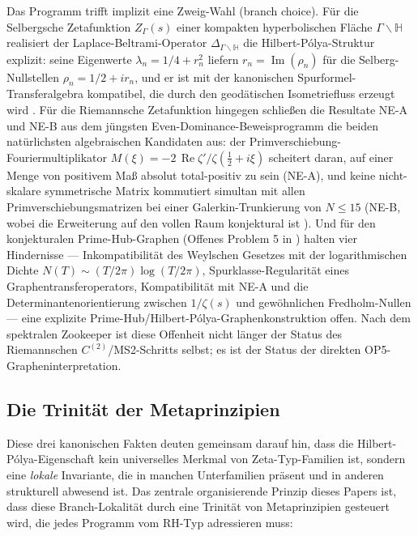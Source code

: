 \documentclass[11pt]{article}
\theoremstyle{definition}
\theoremstyle{remark}
\renewcommand{\Re}{\operatorname{Re}}
\newcommand{\halfline}{\tfrac{1}{2}}
\newcommand{\zer}[1]{\zeta'/\zeta(#1)}
\begin{document}
Das Programm trifft implizit eine Zweig-Wahl (branch choice). Für die Selbergsche Zetafunktion
$Z_\Gamma(s)$ einer kompakten hyperbolischen Fläche
$\Gamma\backslash\mathbb{H}$ realisiert der Laplace-Beltrami-Operator
$\Delta_{\Gamma\backslash\mathbb{H}}$ die Hilbert-P\'olya-Struktur
explizit: seine Eigenwerte $\lambda_n = 1/4 + r_n^2$ liefern
$r_n = \operatorname{Im}(\rho_n)$ für die Selberg-Nullstellen $\rho_n = 1/2 + ir_n$,
und er ist mit der kanonischen Spurformel-Transferalgebra kompatibel, die durch
den geodätischen Isometriefluss erzeugt wird \cite{Selberg1956}. Für die
Riemannsche Zetafunktion hingegen
schließen die Resultate NE-A und NE-B aus dem jüngsten Even-Dominance-Beweisprogramm
\cite{Geiger2026RHII} die beiden natürlichsten algebraischen Kandidaten aus:
der Primverschiebung-Fouriermultiplikator
$M(\xi) = -2\,\Re\zer{\halfline + i\xi}$ scheitert daran, auf einer Menge von positivem
Maß absolut total-positiv zu sein (NE-A), und keine nicht-skalare symmetrische Matrix
kommutiert simultan mit allen Primverschiebungsmatrizen bei einer
Galerkin-Trunkierung von $N\leq 15$ (NE-B, wobei die Erweiterung auf den vollen Raum konjektural
ist \cite{Geiger2026RHII}). Und für den konjekturalen Prime-Hub-Graphen (Offenes Problem 5 in
\cite{Geiger2026RHIII}) halten vier Hindernisse --- Inkompatibilität des Weylschen
Gesetzes mit der logarithmischen Dichte $N(T)\sim (T/2\pi)\log(T/2\pi)$, Spurklasse-Regularität
eines Graphentransferoperators, Kompatibilität mit NE-A und die
Determinantenorientierung zwischen $1/\zeta(s)$ und gewöhnlichen
Fredholm-Nullen --- eine explizite
Prime-Hub/Hilbert-P\'olya-Graphenkonstruktion offen. Nach dem spektralen Zookeeper \cite{Zookeeper2026}
ist diese Offenheit nicht länger der Status des Riemannschen $C^{(2)}$/MS2-Schritts
selbst; es ist der Status der direkten OP5-Grapheninterpretation.

\subsection{Die Trinität der Metaprinzipien}
\label{sec:trinity}

Diese drei kanonischen Fakten deuten gemeinsam darauf hin, dass die Hilbert-P\'olya-Eigenschaft
kein universelles Merkmal von Zeta-Typ-Familien ist, sondern eine \emph{lokale}
Invariante, die in manchen Unterfamilien präsent und in anderen strukturell
abwesend ist. Das zentrale organisierende Prinzip dieses Papers ist,
dass diese Branch-Lokalität durch eine Trinität von Metaprinzipien gesteuert wird,
die jedes Programm vom RH-Typ adressieren muss:
\end{document}
